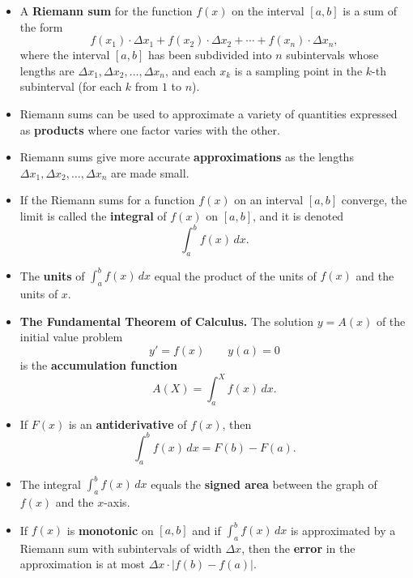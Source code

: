 \begin{itemize}

\item A {\bf Riemann sum} for the function $f(x)$
  on the interval $[a,b]$ is a sum of the form
	\[
f(x_1) \cdot \Delta x_1 + f(x_2) \cdot \Delta x_2 + \cdots + 
		f(x_n) \cdot \Delta x_n,
\]
where the interval $[a,b]$ has been subdivided into $n$ subintervals whose lengths are $\Delta x_1, \Delta x_2, \ldots, \Delta x_n$, and each $x_k$ is a sampling point in the $k$-th subinterval (for each $k$ from $1$ to $n$).

\item Riemann sums can be used to approximate a variety of quantities
  expressed as {\bf products} where one factor varies with the other.

\item Riemann sums give more accurate {\bf approximations} as the
  lengths $\Delta x_1, \Delta x_2, \ldots , \Delta x_n$ are made
  small.

\item If the Riemann sums for a function $f(x)$ on an interval $[a,b]$
  converge, the limit is called the {\bf integral} of
  $f(x)$ on $[a,b]$, and it is denoted
	\[
\int_a^b f(x) \, dx.
\]

\item The {\bf units} of $\int_a^b f(x) \, dx$ equal the product of
  the units of $f(x)$ and the units of $x$.

\item {\bf The Fundamental Theorem of Calculus.}
\newline
The solution $y=A(x)$ of the initial value problem
\[
y'=f(x) \qquad y(a) = 0
\]
is the {\bf accumulation function} 
	\[
A(X) = \int_a^X f(x)\, dx.
\]

\item If $F(x)$ is an {\bf antiderivative} of
  $f(x)$, then
	\[
\int_a^b f(x) \, dx = F(b) - F(a).
\]

\item The integral $\int_a^b f(x) \, dx$ equals the {\bf signed
  area} between the graph of $f(x)$ and the
  $x$-axis.

\item If $f(x)$ is {\bf monotonic} on
  $[a,b]$ and if $\int_a^b f(x) \, dx$ is approximated by a Riemann
  sum with subintervals of width $\Delta x$, then the {\bf
    error} in the approximation is at most $\Delta x
  \cdot |f(b) - f(a)|$.

\end{itemize}

